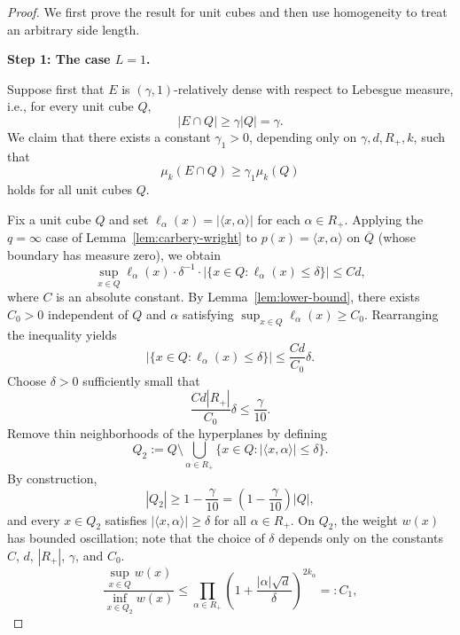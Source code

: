 \documentclass[12pt]{article}
\begin{document}
\begin{proof}
We first prove the result for unit cubes and then use homogeneity to treat an arbitrary side length.


\medskip
\noindent\textbf{Step 1: The case $L=1$.}

Suppose first that $E$ is $(\gamma,1)$-relatively dense with respect to Lebesgue measure, i.e., for every unit cube $Q$,
\[
|E \cap Q| \ge \gamma |Q| = \gamma.
\]
We claim that there exists a constant $\gamma_1>0$, depending only on $\gamma,d,R_+,k$, such that
\[
\mu_k(E \cap Q) \ge \gamma_1 \mu_k(Q)
\]
holds for all unit cubes $Q$.

Fix a unit cube $Q$ and set $\ell_\alpha(x)=|\langle x,\alpha\rangle|$ for each $\alpha\in R_+$. Applying the $q=\infty$ case of Lemma~\ref{lem:carbery-wright} to $p(x)=\langle x,\alpha\rangle$ on $\overline Q$ (whose boundary has measure zero), we obtain
\begin{equation}\label{E6}
\sup_{x\in Q} \ell_\alpha(x) \cdot \delta^{-1} \cdot \bigl|\{ x\in Q : \ell_\alpha(x) \le \delta \}\bigr| \le C d,
\end{equation}
where $C$ is an absolute constant.
By Lemma~\ref{lem:lower-bound}, there exists $C_0>0$ independent of $Q$ and $\alpha$ satisfying $\sup_{x\in Q} \ell_\alpha(x) \ge C_0$. Rearranging the inequality yields
\[
\bigl|\{ x\in Q : \ell_\alpha(x) \le \delta \}\bigr| \le \frac{C d}{C_0} \delta.
\]
Choose $\delta>0$ sufficiently small that
\[
\frac{C d|R_+|}{C_0} \delta \le \frac{\gamma}{10}.
\]
Remove thin neighborhoods of the hyperplanes by defining
\[
Q_2 := Q \setminus \bigcup_{\alpha \in R_+} \bigl\{ x\in Q : \bigl|\langle x,\alpha\rangle\bigr| \le \delta \bigr\}.
\]
By construction,
\[
|Q_2| \ge 1 - \frac{\gamma}{10} = \left(1 - \frac{\gamma}{10}\right)|Q|,
\]
and every $x\in Q_2$ satisfies $\bigl|\langle x,\alpha\rangle\bigr| \ge \delta$ for all $\alpha\in R_+$. On $Q_2$, the weight $w(x)$ has bounded oscillation; note that the choice of $\delta$ depends only on the constants $C$, $d$, $|R_+|$, $\gamma$, and $C_0$.
\begin{equation}\label{E1}
\frac{\sup_{x\in Q} w(x)}{\inf_{x\in Q_2} w(x)}
\le \prod_{\alpha\in R_+} \left(1 + \frac{|\alpha|\sqrt{d}}{\delta}\right)^{2k_\alpha}
=: C_1,
\end{equation}

\end{proof}
\end{document}
